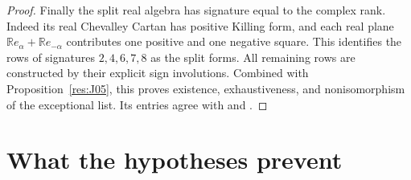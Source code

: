 \begin{proof}
Finally the split real algebra has signature equal to
the complex rank. Indeed its real Chevalley Cartan
has positive Killing form, and each real plane
\(\mathbb R e_\alpha+\mathbb R e_{-\alpha}\) contributes
one positive and one negative square. This identifies
the rows of signatures \(2,4,6,7,8\) as the split
forms. All remaining rows are constructed by their
explicit sign involutions. Combined with
Proposition~\ref{res:J05}, this proves existence,
exhaustiveness, and nonisomorphism of the exceptional
list. Its entries agree with
\cite[Section 42]{etingof} and
\cite[Theorem 6.105]{knapp}.
\end{proof}

\section{What the hypotheses prevent}

